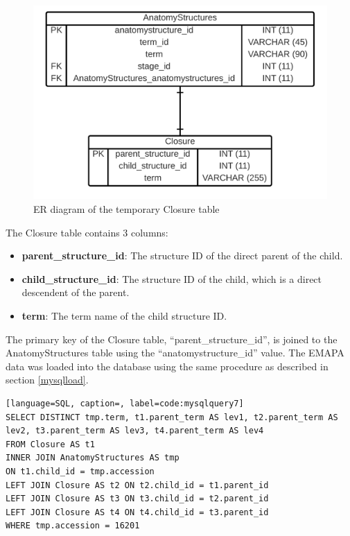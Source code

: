 \begin{figure}[H]\begin{center}\includegraphics[width=1\linewidth]{images/closuretableER}\caption{ER diagram of the temporary Closure table}\label{fig:closuretable}\end{center}\end{figure}

The Closure table contains 3 columns:

\begin{itemize}
\item \textbf{parent\_structure\_id}: The structure ID of the direct parent of the child.
\item \textbf{child\_structure\_id}: The structure ID of the child, which is a direct descendent of the parent.
\item \textbf{term}: The term name of the child structure ID.
\end{itemize}

The primary key of the Closure table, ``parent\_structure\_id'', is joined to the AnatomyStructures table using the ``anatomystructure\_id'' value. The EMAPA data was loaded into the database using the same procedure as described in section \ref{mysqlload}.

\begin{lstlisting}[language=SQL, caption=, label=code:mysqlquery7]
SELECT DISTINCT tmp.term, t1.parent_term AS lev1, t2.parent_term AS lev2, t3.parent_term AS lev3, t4.parent_term AS lev4
FROM Closure AS t1
INNER JOIN AnatomyStructures AS tmp
ON t1.child_id = tmp.accession
LEFT JOIN Closure AS t2 ON t2.child_id = t1.parent_id
LEFT JOIN Closure AS t3 ON t3.child_id = t2.parent_id
LEFT JOIN Closure AS t4 ON t4.child_id = t3.parent_id
WHERE tmp.accession = 16201
\end{lstlisting}

